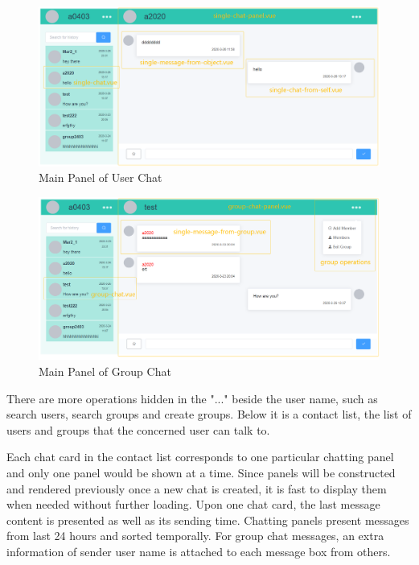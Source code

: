 \begin{figure}[H]
 \centering
  \includegraphics[width=1\textwidth]{images/user.png}
  \caption{Main Panel of User Chat}
  \label{tab:main-panel-of-user-chat}
\end{figure}

\begin{figure}[H]
 \centering
  \includegraphics[width=1\textwidth]{images/group.png}
  \caption{Main Panel of Group Chat}
  \label{tab:main-panel-of-group-chat}
\end{figure}

There are more operations hidden in the "..." beside the user name, such as search users, search groups and create groups. Below it is a contact list, the list of users and groups that the concerned user can talk to. 

Each chat card in the contact list corresponds to one particular chatting panel and only one panel would be shown at a time. Since panels will be constructed and rendered previously once a new chat is created, it is fast to display them when needed without further loading. Upon one chat card, the last message content is presented as well as its sending time. Chatting panels present messages from last 24 hours and sorted temporally. For group chat messages, an extra information of sender user name is attached to each message box from others.

